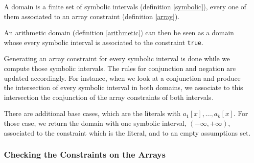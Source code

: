\begin{definition}[Domain]

A domain is a finite set of symbolic intervals (definition
\ref{symbolic}), every one of them associated to an array constraint
(definition \ref{array}).

\label{domain}

\end{definition}

An arithmetic domain (definition \ref{arithmetic}) can then be seen as a
domain whose every symbolic interval is associated to the constraint
\texttt{true}.

Generating an array constraint for every symbolic interval is done while we compute those symbolic
intervals. The rules for conjunction and negation are updated accordingly. For instance, when we
look at a conjunction and produce the intersection of every symbolic interval in both domains, we
associate to this intersection the conjunction of the array constraints of both intervals.

There are additional base cases, which are the literals with $a_1[x], \ldots, a_k[x]$. For those
case, we return the domain with one symbolic interval, $(-\infty, +\infty)$, associated to the
constraint which is the literal, and to an empty assumptions set.

\subsubsection{Checking the Constraints on the Arrays}

